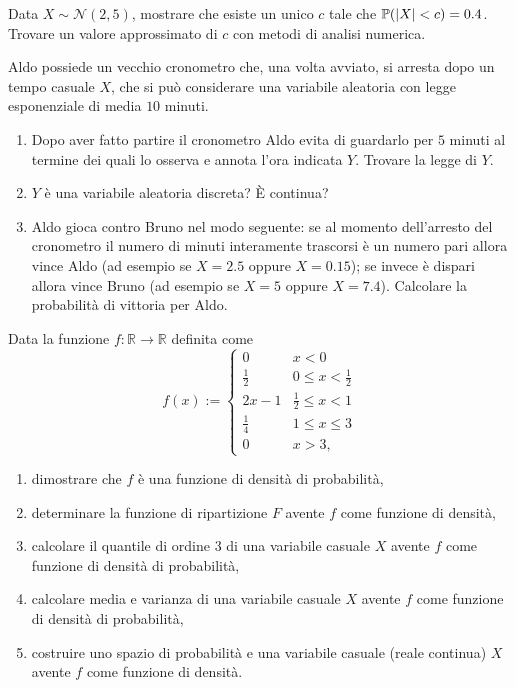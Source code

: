 Data $X\sim \mathcal{N}( 2,5)$, mostrare che esiste un unico $c$ tale che $\mathbb{P}(| X| < c) =0.4$. Trovare un valore approssimato di $c$ con metodi di analisi numerica.
\Esercizio{}

Aldo possiede un vecchio cronometro che, una volta avviato, si arresta dopo un tempo casuale $X$, che si può considerare una variabile aleatoria con legge esponenziale di media $10$ minuti.
\begin{enumerate}
\item Dopo aver fatto partire il cronometro Aldo evita di guardarlo per $5$ minuti al termine dei quali lo osserva e annota l'ora indicata $Y$. Trovare la legge di $Y$.
\item $Y$ è una variabile aleatoria discreta? È continua?
\item Aldo gioca contro Bruno nel modo seguente: se al momento dell'arresto del cronometro il numero di minuti interamente trascorsi è un numero pari allora vince Aldo (ad esempio se $X=2.5$ oppure $X=0.15$); se invece è dispari allora vince Bruno (ad esempio se $X=5$ oppure $X=7.4$). Calcolare la probabilità di vittoria per Aldo.
\end{enumerate}
\Esercizio{}

Data la funzione $f:\mathbb{R}\rightarrow \mathbb{R}$ definita come
\begin{equation*}
f( x) :=\begin{cases}
0 & x< 0\\
\frac{1}{2} & 0\leq x< \frac{1}{2}\\
2x-1 & \frac{1}{2} \leq x< 1\\
\frac{1}{4} & 1\leq x\leq 3\\
0 & x >3,
\end{cases}
\end{equation*}
\begin{enumerate}
\item dimostrare che $f$ è una funzione di densità di probabilità,
\item determinare la funzione di ripartizione $F$ avente $f$ come funzione di densità,
\item calcolare il quantile di ordine $3$ di una variabile casuale $X$ avente $f$ come funzione di densità di probabilità,
\item calcolare media e varianza di una variabile casuale $X$ avente $f$ come funzione di densità di probabilità,
\item costruire uno spazio di probabilità e una variabile casuale (reale continua) $X$ avente $f$ come funzione di densità.
\end{enumerate}


\ParteSoluzioni